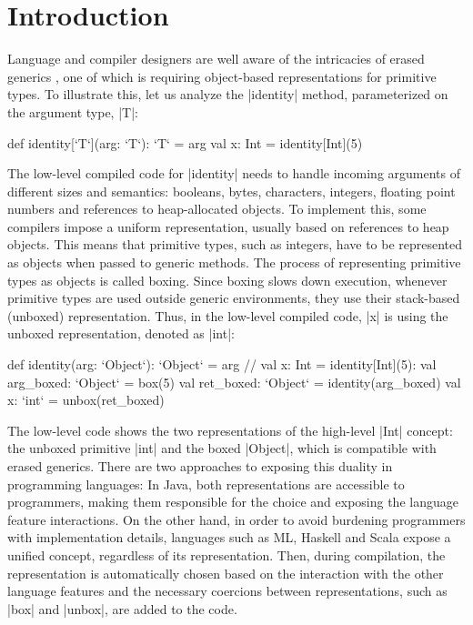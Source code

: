 
\section{Introduction}
\label{sec:Intro}

Language and compiler designers are well aware of the intricacies of erased generics \cite{leroy-unboxed-objects, morrison-napier88, harper-intensional-type-analysis, java-erasure, dot-net-generics, iuli-thesis, miniboxing, spj-unboxed-values}, one of which is requiring object-based representations for primitive types. To illustrate this, let us analyze the |identity| method, parameterized on the argument type, |T|:

\begin{lstlisting-nobreak}
 def identity[`T`](arg: `T`): `T` = arg
 val x: Int = identity[Int](5)
\end{lstlisting-nobreak}

The low-level compiled code for |identity| needs to handle incoming arguments of different sizes and semantics: booleans, bytes, characters, integers, floating point numbers and references to heap-allocated objects. To implement this, some compilers impose a uniform representation, usually based on references to heap objects. This means that primitive types, such as integers, have to be represented as objects when passed to generic methods. The process of representing primitive types as objects is called boxing. Since boxing slows down execution, whenever primitive types are used outside generic environments, they use their stack-based (unboxed) representation. Thus, in the low-level compiled code, |x| is using the unboxed representation, denoted as |int|:

\begin{lstlisting-nobreak}
 def identity(arg: `Object`): `Object` = arg
 // val x: Int = identity[Int](5):
 val arg_boxed: `Object` = box(5)
 val ret_boxed: `Object` = identity(arg_boxed)
 val x: `int` = unbox(ret_boxed)
\end{lstlisting-nobreak}

The low-level code shows the two representations of the high-level |Int| concept: the unboxed primitive |int| and the boxed |Object|, which is compatible with erased generics. There are two approaches to exposing this duality in programming languages: In Java, both representations are accessible to programmers, making them responsible for the choice and exposing the language feature interactions. On the other hand, in order to avoid burdening programmers with implementation details, languages such as ML, Haskell and Scala expose a unified concept, regardless of its representation. Then, during compilation, the representation is automatically chosen based on the interaction with the other language features and the necessary coercions between representations, such as |box| and |unbox|, are added to the code.

